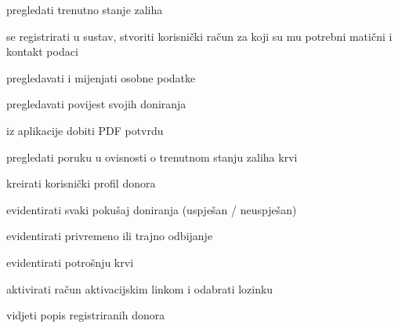 \begin{packed_enum}
	\item  {}
	
	\begin{packed_enum}
		
		\item pregledati trenutno stanje zaliha
		\item se registrirati u sustav, stvoriti korisnički račun za koji su mu potrebni matični i kontakt podaci
		
	\end{packed_enum}
	
	\item  {}
	
	\begin{packed_enum}
		
		\item pregledavati i mijenjati osobne podatke
		\item pregledavati povijest svojih doniranja
		\item iz aplikacije dobiti PDF potvrdu
		\item pregledati poruku u ovisnosti o trenutnom stanju zaliha krvi
		
	\end{packed_enum}
	
	\item  {}
	
	\begin{packed_enum}
		
		\item kreirati korisnički profil donora
		\item evidentirati svaki pokušaj doniranja (uspješan / neuspješan) 
		\item evidentirati privremeno ili trajno odbijanje
		\item evidentirati potrošnju krvi 
		\item aktivirati račun aktivacijskim linkom i odabrati lozinku
		\item vidjeti popis registriranih donora
		
	\end{packed_enum}
	\eject
	
	\item  {}
	
	\begin{packed_enum}
		

\end{packed_enum}
\end{packed_enum}
